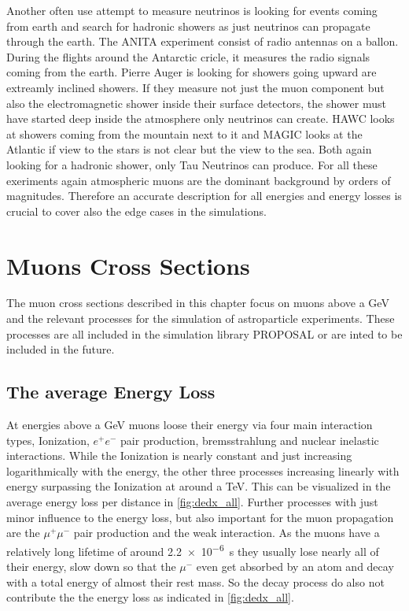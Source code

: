 Another often use attempt to measure neutrinos is looking for events coming from earth and search for hadronic showers as just neutrinos can propagate through the earth.
The ANITA experiment consist of radio antennas on a ballon.
During the flights around the Antarctic cricle, it measures the radio signals coming from the earth.
Pierre Auger is looking for showers going upward are extreamly inclined showers.
If they measure not just the muon component but also the electromagnetic shower inside their surface detectors, the shower must have started deep inside the atmosphere only neutrinos can create.
HAWC looks at showers coming from the mountain next to it and MAGIC looks at the Atlantic if view to the stars is not clear but the view to the sea.
Both again looking for a hadronic shower, only Tau Neutrinos can produce.
For all these exeriments again atmospheric muons are the dominant background by orders of magnitudes.
Therefore an accurate description for all energies and energy losses is crucial to cover also the edge cases in the simulations.

\chapter{Muons Cross Sections}
\label{sec:cross_section}

The muon cross sections described in this chapter focus on muons above a GeV and the relevant processes for the simulation of astroparticle experiments.
These processes are all included in the simulation library PROPOSAL or are inted to be included in the future.

\section{The average Energy Loss}

At energies above a GeV muons loose their energy via four main interaction types, Ionization, $e^+e^-$ pair production, bremsstrahlung and nuclear inelastic interactions.
While the Ionization is nearly constant and just increasing logarithmically with the energy, the other three processes increasing linearly with energy surpassing the Ionization at around a TeV.
This can be visualized in the average energy loss per distance in \ref{fig:dedx_all}.
Further processes with just minor influence to the energy loss, but also important for the muon propagation are the $\mu^+\mu^-$ pair production and the weak interaction.
As the muons have a relatively long lifetime of around \SI{2.2e-6}{\second} \cite{PDG} they usually lose nearly all of their energy, slow down so that the $\mu^-$ even get absorbed by an atom and decay with a total energy of almost their rest mass.
So the decay process do also not contribute the the energy loss as indicated in \ref{fig:dedx_all}.

